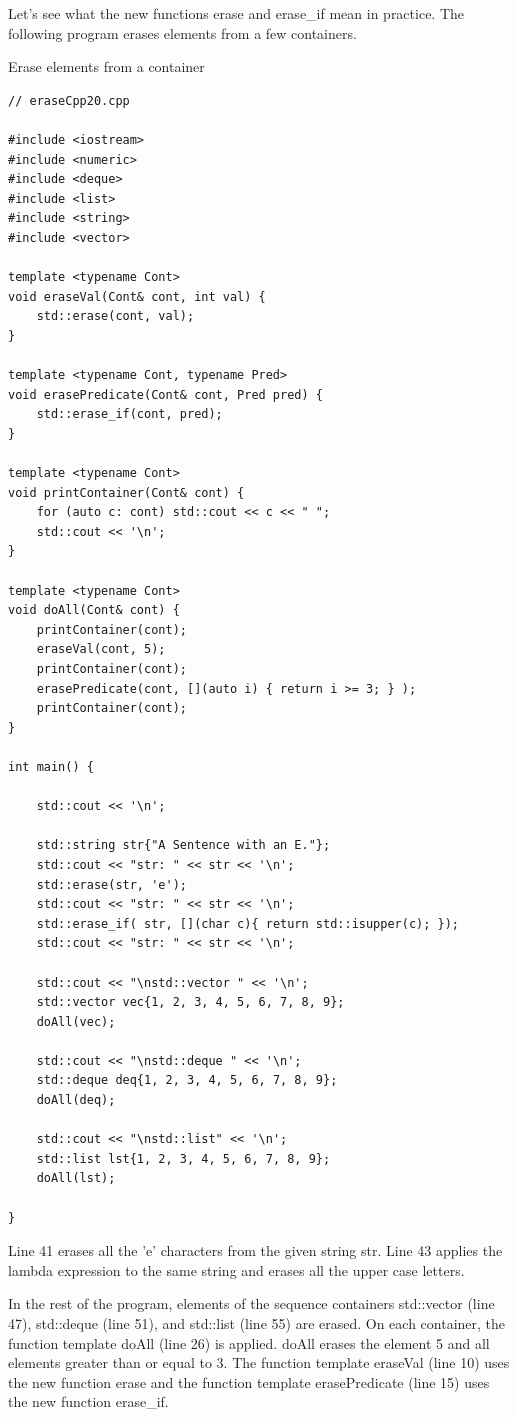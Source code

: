 Let’s see what the new functions erase and erase\_if mean in practice. The following program erases elements from a few containers.

\noindent
Erase elements from a container
\begin{lstlisting}[style=styleCXX]
// eraseCpp20.cpp

#include <iostream>
#include <numeric>
#include <deque>
#include <list>
#include <string>
#include <vector>

template <typename Cont>
void eraseVal(Cont& cont, int val) {
	std::erase(cont, val);
}

template <typename Cont, typename Pred>
void erasePredicate(Cont& cont, Pred pred) {
	std::erase_if(cont, pred);
}

template <typename Cont>
void printContainer(Cont& cont) {
	for (auto c: cont) std::cout << c << " ";
	std::cout << '\n';
}

template <typename Cont>
void doAll(Cont& cont) {
	printContainer(cont);
	eraseVal(cont, 5);
	printContainer(cont);
	erasePredicate(cont, [](auto i) { return i >= 3; } );
	printContainer(cont);
}

int main() {

	std::cout << '\n';
	
	std::string str{"A Sentence with an E."};
	std::cout << "str: " << str << '\n';
	std::erase(str, 'e');
	std::cout << "str: " << str << '\n';
	std::erase_if( str, [](char c){ return std::isupper(c); });
	std::cout << "str: " << str << '\n';
	
	std::cout << "\nstd::vector " << '\n';
	std::vector vec{1, 2, 3, 4, 5, 6, 7, 8, 9};
	doAll(vec);
	
	std::cout << "\nstd::deque " << '\n';
	std::deque deq{1, 2, 3, 4, 5, 6, 7, 8, 9};
	doAll(deq);
	
	std::cout << "\nstd::list" << '\n';
	std::list lst{1, 2, 3, 4, 5, 6, 7, 8, 9};
	doAll(lst);

}
\end{lstlisting}

Line 41 erases all the 'e' characters from the given string str. Line 43 applies the lambda expression to the same string and erases all the upper case letters.

In the rest of the program, elements of the sequence containers std::vector (line 47), std::deque (line 51), and std::list (line 55) are erased. On each container, the function template doAll (line 26) is applied. doAll erases the element 5 and all elements greater than or equal to 3. The function template eraseVal (line 10) uses the new function erase and the function template erasePredicate (line 15) uses the new function erase\_if.

